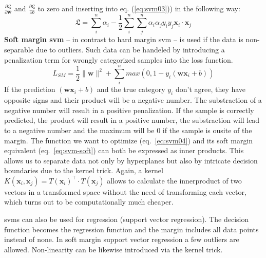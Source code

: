 $\frac{\partial \mathfrak{L}}{\partial \mathbf{w}}$ and $\frac{\partial \mathfrak{L}}{\partial b}$ 
to zero and inserting into eq. (\ref{eq:svm03}))\cite{winston1992artificial,cherkassky1998learning} in the following way: 
\begin{equation}
	\label{eq:svm04}
	\mathfrak{L} = \sum_i^n \alpha_i - \frac{1}{2} \sum_i^n \sum_j^n \alpha_i \alpha_j y_i y_j \mathbf{x}_i \cdot \mathbf{x}_j 
\end{equation}
%
\textbf{Soft margin \gls{svm}} -- in contrast to hard margin \gls{svm} -- is used if the data is non-separable due to outliers\cite{cortes1995support}.
Such data can be handeled by introducing a penalization term for wrongly categorized samples into the loss function. 
\begin{equation}
	\label{eq:svm-soft}
	L_{SM} = \frac{1}{2} \|\mathbf{w}\|^2 + \sum_i^n max \left( 0, 1- y_i ( \mathbf{w} \mathbf{x}_i + b ) \right) 
\end{equation}
If the prediction $(\mathbf{w}\mathbf{x}_i+b)$ and the true category $y_i$ don't agree, 
they have opposite signs and their product will be a negative number.
The substraction of a negative number will result in a positive penalization. 
If the sample is correctly predicted, the product will result in a positive number, 
the substraction will lead to a negative number and the maximum will be 0 if the sample is ousite of the margin. 
%
The function we want to optimize (eq.~\ref{eq:svm04}) and its soft margin equivalent (eq.~\ref{eq:svm-soft}) can both be expressed as inner products. 
This allows us to separate data not only by hyperplanes 
but also by intricate decision boundaries due to the kernel trick. 
Again, a kernel $K(\mathbf{x}_i, \mathbf{x}_j) = T(\mathbf{x}_i)^\top \cdot T(\mathbf{x}_j)$ allows to calculate the innerproduct of two vectors in a transformed space without the need of transforming each vector, which turns out to be computationally much cheaper. 

\Gls{svm}s can also be used for regression (support vector regression).
The decision function becomes the regression function and the margin includes all data points instead of none. 
In soft margin support vector regression a few
outliers are allowed.
Non-linearity can be likewise introduced via the kernel trick. 

